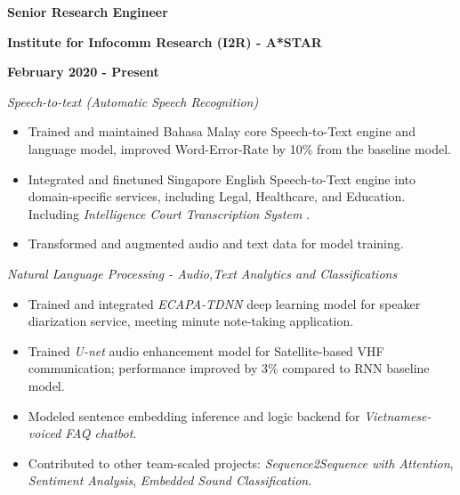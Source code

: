 \documentclass[10pt]{article}
\newcommand{\blackhref}[3][black]{\href{#2}{\color{#1}{#3}}}%
\begin{document}
        \begin{multicols}{3}
            \begin{flushleft}
                \textbf{Senior Research Engineer}
            \end{flushleft}

            \columnbreak

            \begin{center}
                \textbf{Institute for Infocomm Research (I2R) - A*STAR}
            \end{center}

            \columnbreak

            \begin{flushright}
                \textbf{February 2020 - Present}
            \end{flushright}
        \end{multicols}

        \vspace{-5mm}
        \emph{Speech-to-text (Automatic Speech Recognition)}
        \vspace{-2.5mm}
        \begin{itemize}[noitemsep]
            \item Trained and maintained Bahasa Malay core Speech-to-Text engine and language model, improved Word-Error-Rate by 10\% from the baseline model.
            \item Integrated and finetuned Singapore English Speech-to-Text engine into domain-specific services, including Legal, Healthcare, and Education. Including \emph{Intelligence Court Transcription System} \blackhref{https://www.straitstimes.com/singapore/courts-crime/state-courts-to-use-system-that-instantly-transcribes-court-proceedings}{\faLink}.
            \item Transformed and augmented audio and text data for model training.
        \end{itemize}

        \emph{Natural Language Processing - Audio,Text Analytics and Classifications}
        \vspace{-2.5mm}
        \begin{itemize}[noitemsep]
            \item Trained and integrated \emph{ECAPA-TDNN} deep learning model for speaker diarization service, meeting minute note-taking application.
            \item Trained \emph{U-net} audio enhancement model for Satellite-based VHF communication; performance improved by 3\% compared to RNN baseline model.
            \item Modeled sentence embedding inference and logic backend for \emph{Vietnamese-voiced FAQ chatbot}.
            \item Contributed to other team-scaled projects: \emph{Sequence2Sequence with Attention}, \emph{Sentiment Analysis}, \emph{Embedded Sound Classification}.
        \end{itemize}
\end{document}
